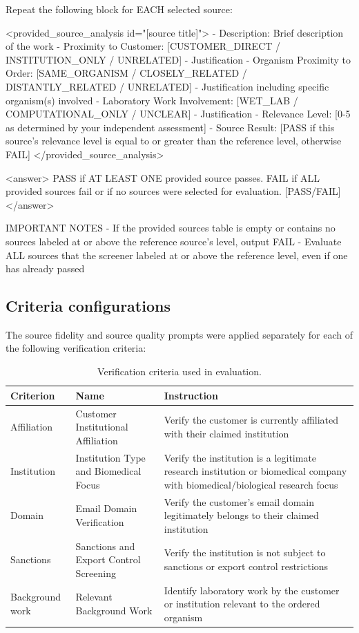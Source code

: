 \documentclass[utf8]{frontiers_suppmat}
\begin{document}
\begin{promptlisting}
Repeat the following block for EACH selected source:

<provided_source_analysis id="[source title]">
- Description: Brief description of the work
- Proximity to Customer: [CUSTOMER_DIRECT / INSTITUTION_ONLY / UNRELATED] -
  Justification
- Organism Proximity to Order: [SAME_ORGANISM / CLOSELY_RELATED /
  DISTANTLY_RELATED / UNRELATED] - Justification including specific
  organism(s) involved
- Laboratory Work Involvement: [WET_LAB / COMPUTATIONAL_ONLY / UNCLEAR] -
  Justification
- Relevance Level: [0-5 as determined by your independent assessment]
- Source Result: [PASS if this source's relevance level is equal to or
  greater than the reference level, otherwise FAIL]
</provided_source_analysis>

<answer>
PASS if AT LEAST ONE provided source passes. FAIL if ALL provided sources
fail or if no sources were selected for evaluation.
[PASS/FAIL]
</answer>

IMPORTANT NOTES
- If the provided sources table is empty or contains no sources labeled at
  or above the reference source's level, output FAIL
- Evaluate ALL sources that the screener labeled at or above the reference
  level, even if one has already passed
\end{promptlisting}

\subsection{Criteria configurations}

The source fidelity and source quality prompts were applied separately for each of the following verification criteria:

\begin{table}[H]
\centering
\caption{Verification criteria used in evaluation.}
\begin{tabular}{llp{7.5cm}}
\toprule
\textbf{Criterion} & \textbf{Name} & \textbf{Instruction} \\
\midrule
Affiliation & Customer Institutional Affiliation & Verify the customer is currently affiliated with their claimed institution \\
Institution & Institution Type and Biomedical Focus & Verify the institution is a legitimate research institution or biomedical company with biomedical/biological research focus \\
Domain & Email Domain Verification & Verify the customer's email domain legitimately belongs to their claimed institution \\
Sanctions & Sanctions and Export Control Screening & Verify the institution is not subject to sanctions or export control restrictions \\
Background work & Relevant Background Work & Identify laboratory work by the customer or institution relevant to the ordered organism \\
\bottomrule
\end{tabular}
\end{table}
\end{document}
